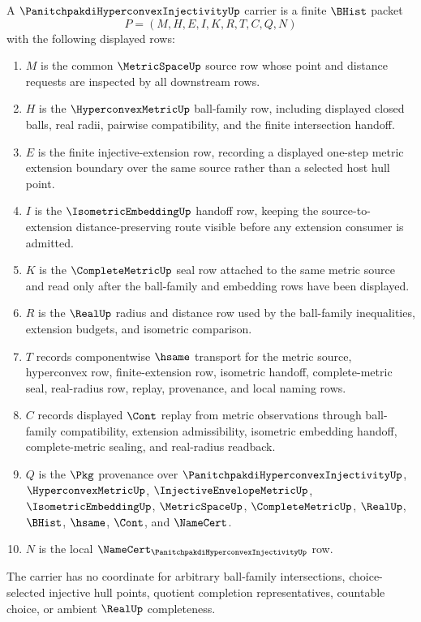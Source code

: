 \begin{definition}
\label{def:panitchpakdi-hyperconvex-injectivity-carrier}
A $\PanitchpakdiHyperconvexInjectivityUp$ carrier is a finite $\BHist$ packet
$$
P=(M,H,E,I,K,R,T,C,Q,N)
$$
with the following displayed rows:
\begin{enumerate}
\item $M$ is the common $\MetricSpaceUp$ source row whose point and distance requests are inspected by all downstream rows.
\item $H$ is the $\HyperconvexMetricUp$ ball-family row, including displayed closed balls, real radii, pairwise compatibility, and the finite intersection handoff.
\item $E$ is the finite injective-extension row, recording a displayed one-step metric extension boundary over the same source rather than a selected host hull point.
\item $I$ is the $\IsometricEmbeddingUp$ handoff row, keeping the source-to-extension distance-preserving route visible before any extension consumer is admitted.
\item $K$ is the $\CompleteMetricUp$ seal row attached to the same metric source and read only after the ball-family and embedding rows have been displayed.
\item $R$ is the $\RealUp$ radius and distance row used by the ball-family inequalities, extension budgets, and isometric comparison.
\item $T$ records componentwise $\hsame$ transport for the metric source, hyperconvex row, finite-extension row, isometric handoff, complete-metric seal, real-radius row, replay, provenance, and local naming rows.
\item $C$ records displayed $\Cont$ replay from metric observations through ball-family compatibility, extension admissibility, isometric embedding handoff, complete-metric sealing, and real-radius readback.
\item $Q$ is the $\Pkg$ provenance over $\PanitchpakdiHyperconvexInjectivityUp$, $\HyperconvexMetricUp$, $\InjectiveEnvelopeMetricUp$, $\IsometricEmbeddingUp$, $\MetricSpaceUp$, $\CompleteMetricUp$, $\RealUp$, $\BHist$, $\hsame$, $\Cont$, and $\NameCert$.
\item $N$ is the local $\NameCert_{\PanitchpakdiHyperconvexInjectivityUp}$ row.
\end{enumerate}
The carrier has no coordinate for arbitrary ball-family intersections, choice-selected injective hull points, quotient completion representatives, countable choice, or ambient $\RealUp$ completeness.
\end{definition}

